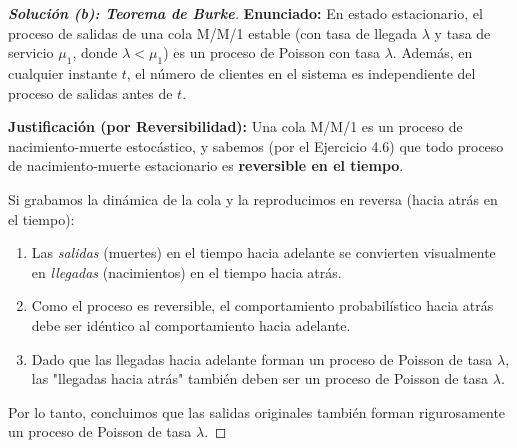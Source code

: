 \documentclass[10pt,a4paper]{article}
\begin{document}
\vspace{5mm}

\begin{proof}[\textbf{Solución (b): Teorema de Burke}]
    \textbf{Enunciado:} En estado estacionario, el proceso de salidas de una cola M/M/1 estable (con tasa de llegada $\lambda$ y tasa de servicio $\mu_1$, donde $\lambda < \mu_1$) es un proceso de Poisson con tasa $\lambda$. Además, en cualquier instante $t$, el número de clientes en el sistema es independiente del proceso de salidas antes de $t$.
    
    \textbf{Justificación (por Reversibilidad):} 
    Una cola M/M/1 es un proceso de nacimiento-muerte estocástico, y sabemos (por el Ejercicio 4.6) que todo proceso de nacimiento-muerte estacionario es \textbf{reversible en el tiempo}. 
    
    Si grabamos la dinámica de la cola y la reproducimos en reversa (hacia atrás en el tiempo):
    \begin{enumerate}
        \item Las \textit{salidas} (muertes) en el tiempo hacia adelante se convierten visualmente en \textit{llegadas} (nacimientos) en el tiempo hacia atrás.
        \item Como el proceso es reversible, el comportamiento probabilístico hacia atrás debe ser idéntico al comportamiento hacia adelante.
        \item Dado que las llegadas hacia adelante forman un proceso de Poisson de tasa $\lambda$, las "llegadas hacia atrás" también deben ser un proceso de Poisson de tasa $\lambda$.
    \end{enumerate}
    Por lo tanto, concluimos que las salidas originales también forman rigurosamente un proceso de Poisson de tasa $\lambda$.
\end{proof}

\vspace{5mm}
\end{document}
